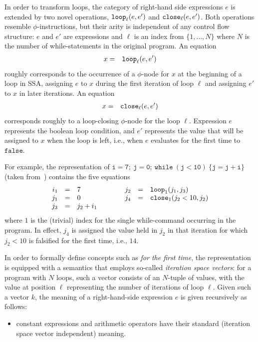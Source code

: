 {In order to transform loops, the category of right-hand side
expressions $e$ is extended by two novel operations, $\mathtt{loop}_{{\ell}}({e},{e'})$ and $\mathtt{close}_{{\ell}}({e},{e'})$.
Both operations resemble $\phi$-instructions, but their arity is
independent of any control flow structure: $e$ and $e'$ are
expressions and $\ell$ is an index from $\{1,\ldots,N\}$ where $N$ is
the number of while-statements in the original program.  An equation
\begin{eqnarray*}
x & = & \mathtt{loop}_{{\ell}}({e},{e'})
\end{eqnarray*}
roughly corresponds to the occurrence of a $\phi$-node for $x$ at the
beginning of a loop in SSA, assigning $e$ to $x$ during the first
iteration of loop $\ell$ and assigning $e'$ to $x$ in later
iterations.
An equation 
\begin{eqnarray*}
x & = & \mathtt{close}_{{\ell}}({e},{e'})
\end{eqnarray*}
corresponds roughly to a loop-closing $\phi$-node for the loop
$\ell$. Expression $e$ represents the boolean loop condition, and $e'$
represents the value that will be assigned to $x$ when the loop is
left, i.e., when $e$ evaluates for the first time to $\mathtt{false}$.

For example, the representation of
$\mathtt{i=7;\ j=0;\ while\ (j<10)\ \{j=j+i\}}$
(taken from~\cite{PopJS2007}) contains the five equations
$$
\begin{array}{rclcrcl}
i_1 & = & 7 & \qquad & j_2 & = & \mathtt{loop}_{{1}}({j_1},{j_3})\\
j_1 & = & 0 & & j_4 & = & \mathtt{close}_{{1}}({j_2 < 10},{j_2})\\
j_3 & = & j_2 + i_1
\end{array} 
$$ 
where $1$ is the (trivial) index for the single while-command
occurring in the program.  In effect, $j_4$ is assigned the value held
in $j_2$ in that iteration for which $j_2 < 10$ is falsified for the
first time, i.e., $14$.

In order to formally define concepts such as \emph{for the first
time}, the representation is equipped with a semantics that employs
so-called
\emph{iteration space vectors}: for a program with $N$ loops, such
a vector consists of an $N$-tuple of values, with the value at
position $\ell$ representing the number of iterations of loop $\ell$.
Given such a vector $k$, the meaning of a right-hand-side expression
$e$ is given recursively as follows:

\begin{itemize} 

\item 
constant expressions and arithmetic operators have their standard
(iteration space vector independent) meaning.


\end{itemize}}
